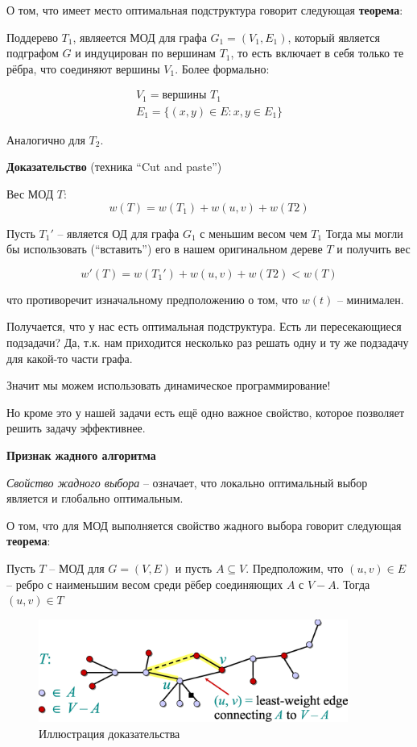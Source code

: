 \documentclass[a4paper,11pt]{article}
\begin{document}
О том, что имеет место оптимальная подструктура говорит следующая \textbf{теорема}:

Поддерево $T_1$, являеется МОД для графа $G_1 = (V_1, E_1)$, который является
подграфом $G$ и индуцирован по вершинам $T_1$, то есть включает в себя только те
рёбра, что соединяют вершины $V_1$. Более формально:

\begin{gather*}
  V_1 = \text{вершины } T_1 \\
  E_1 = \{ (x, y) \in E \colon x, y \in E_1 \}
\end{gather*}


Аналогично для $T_2$.

\textbf{Доказательство} (техника ``Cut and paste'')

Вес МОД $T$:
$$
w(T) = w(T_1) + w(u,v)+ w(T2)
$$

Пусть $T_1'$ -- является ОД для графа $G_1$ с меньшим весом чем $T_1$ Тогда мы
могли бы использовать (``вставить'') его в нашем оригинальном дереве $T$ и
получить вес

$$
w'(T) = w(T_1') + w(u,v)+ w(T2) < w(T)
$$

что противоречит изначальному предположению о том, что $w(t)$ -- минимален.

Получается, что у нас есть оптимальная подструктура. Есть ли пересекающиеся
подзадачи? Да, т.к. нам приходится несколько раз решать одну и ту же подзадачу
для какой-то части графа.

Значит мы можем использовать динамическое программирование!

Но кроме это у нашей задачи есть ещё одно важное свойство, которое позволяет
решить задачу эффективнее.

\textbf{Признак жадного алгоритма}

\emph{Свойство жадного выбора} -- означает, что локально оптимальный выбор является и
глобально оптимальным.

О том, что для МОД выполняется свойство жадного выбора говорит следующая
\textbf{теорема}:

Пусть $T$ -- МОД для $G = (V, E)$ и пусть $A \subseteq V$. Предположим, что $(u,
v) \in E$ -- ребро с наименьшим весом среди рёбер соединяющих $A$ с $V - A$.
Тогда $(u, v) \in T$

\begin{figure}[ht]
  \centering
  \includegraphics[width=4in]{lecture16/mst-proof.eps}
  \caption{Иллюстрация доказательства}
  \label{fig:mst-proof}
\end{figure}
\end{document}
